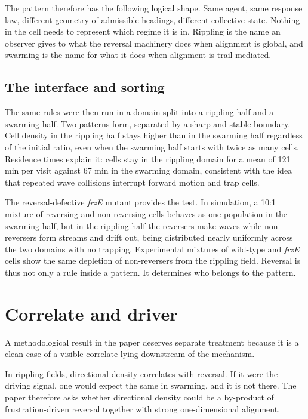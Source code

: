\documentclass[11pt]{article}
\theoremstyle{definition}
\theoremstyle{remark}
\begin{document}
The pattern therefore has the following logical shape. Same agent, same response law, different geometry of admissible headings, different collective state. Nothing in the cell needs to represent which regime it is in. Rippling is the name an observer gives to what the reversal machinery does when alignment is global, and swarming is the name for what it does when alignment is trail-mediated.

\subsection{The interface and sorting}

The same rules were then run in a domain split into a rippling half and a swarming half. Two patterns form, separated by a sharp and stable boundary. Cell density in the rippling half stays higher than in the swarming half regardless of the initial ratio, even when the swarming half starts with twice as many cells. Residence times explain it: cells stay in the rippling domain for a mean of 121 min per visit against 67 min in the swarming domain, consistent with the idea that repeated wave collisions interrupt forward motion and trap cells.

The reversal-defective \emph{frzE} mutant provides the test. In simulation, a 10:1 mixture of reversing and non-reversing cells behaves as one population in the swarming half, but in the rippling half the reversers make waves while non-reversers form streams and drift out, being distributed nearly uniformly across the two domains with no trapping. Experimental mixtures of wild-type and \emph{frzE} cells show the same depletion of non-reversers from the rippling field. Reversal is thus not only a rule inside a pattern. It determines who belongs to the pattern.

\section{Correlate and driver}

A methodological result in the paper deserves separate treatment because it is a clean case of a visible correlate lying downstream of the mechanism.

In rippling fields, directional density correlates with reversal. If it were the driving signal, one would expect the same in swarming, and it is not there. The paper therefore asks whether directional density could be a by-product of frustration-driven reversal together with strong one-dimensional alignment.
\end{document}
